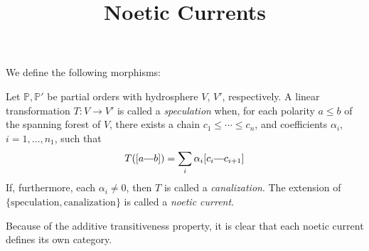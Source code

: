 

\title{Noetic Currents}


	\maketitle
	\par We define the following morphisms:
	\begin{definition}
		Let $\mathbb{P}, \mathbb{P}'$ be partial orders with hydrosphere $V$, $V'$, respectively. A linear transformation $T: V \to V'$ is called a \textit{speculation} when, for each polarity $a \leq b$ of the spanning forest of $V$, there exists a chain $c_1 \leq \cdots \leq c_n$, and coefficients $\alpha_i$, $i = 1, \dots, n_1$, such that 
		\[
			T([a \connect b]) = \sum_i \alpha_i [c_i \connect c_{i+1}]
		\] 
		If, furthermore, each $\alpha_i \neq 0$, then $T$ is called a \textit{canalization}.
		The extension of $\{\text{speculation}, \text{canalization}\}$ is called a \textit{noetic current}.
	\end{definition}

	Because of the additive transitiveness property, it is clear that each noetic current defines its own category. 
	
